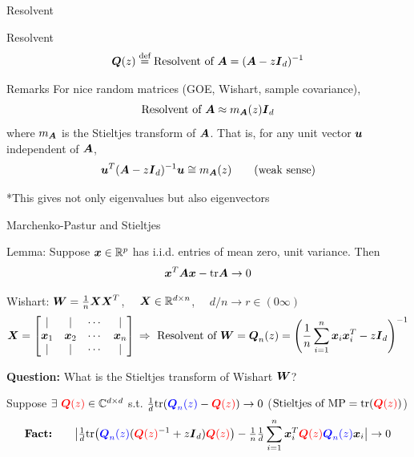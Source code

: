 \documentclass[10pt]{beamer}
\begin{document}
\begin{frame}{Resolvent}
\begin{alertblock}{Resolvent}
  \begin{equation*} \begin{gathered}
      \QQ(z) \defas \text{Resolvent of $\AA$} = (\AA -z \Id_d)^{-1}
  \end{gathered}     
  \end{equation*}
\end{alertblock}
\begin{exampleblock}{Remarks}
For nice random matrices (GOE, Wishart, sample covariance), 
\[\text{Resolvent of $\AA$} \approx m_{\AA}(z) \Id_d\]
where $m_{\AA}$ is the Stieltjes transform of $\AA$. That is, for any unit vector $\uu$ independent of $\AA$, 
\[\uu^T (\AA-z\Id_d)^{-1} \uu \cong m_{\AA}(z) \qquad \text{(weak sense)}\]
\end{exampleblock}
*This gives not only eigenvalues but also eigenvectors
\end{frame}

\begin{frame}{Marchenko-Pastur and Stieltjes}
\begin{alertblock}{Lemma:} Suppose $\xx \in \mathbb{R}^p$ has i.i.d. entries of mean zero, unit variance. Then 
\[\xx^T \AA \xx - \text{tr} \AA \to 0 \]
\end{alertblock}

\begin{exampleblock}{Wishart: $\WW = \frac{1}{n} \XX \XX^T$, \, \, $\XX \in \mathbb{R}^{d \times n}$, \, \, $d/n \to r \in (0\infty)$}
    \[ \XX = 
    \begin{bmatrix} \vert & \vert & \cdots & \vert\\
    \xx_1 & \xx_2 & \cdots & \xx_n\\
    \vert & \vert & \cdots & \vert \end{bmatrix} \, \Rightarrow \ \text{Resolvent of $\WW$} = \QQ_n(z) = \left (\frac{1}{n} \sum_{i=1}^n \xx_i\xx_i^T - z \Id_d \right )^{-1}\]
\end{exampleblock}
\begin{center}
    \textbf{Question:} What is the Stieltjes transform of Wishart $\WW$?
\end{center}
{ \small Suppose $\exists \, \,  \textcolor{red}{\QQ(z)} \in \mathbb{C}^{d \times d }$ s.t. $ \frac{1}{d} \text{tr}(\textcolor{blue}{\QQ_n(z)} - \textcolor{red}{\QQ(z)}) \to 0$ }{\textcolor{mLightGreen}{ \footnotesize ($ \text{Stieltjes of MP} = \text{tr}(\textcolor{red}{\QQ(z)})$) }}
{\small \[ \text{\textbf{Fact:}} \qquad \big | \tfrac{1}{d} \text{tr}\big ( \textcolor{blue}{\QQ_n(z)} ( \textcolor{red}{\QQ(z)}^{-1} + z \Id_d) \textcolor{red}{\QQ(z)} \big ) - \tfrac{1}{n} \tfrac{1}{d} \sum_{i=1}^n \xx_i^T \textcolor{red}{\QQ(z)} \textcolor{blue}{\QQ_n(z)} \xx_i \big | \to 0 \] }
\end{frame}
\end{document}
